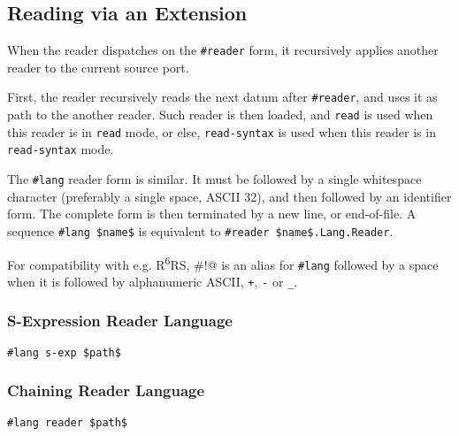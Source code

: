 \subsection{Reading via an Extension}
\label{subsec:aml-base-lang-reader-extension}

When the reader dispatches on the \lstinline!#reader! form, it recursively applies another reader to the current source port. 


First, the reader recursively reads the next datum after \lstinline!#reader!, and uses it as path to the another reader. Such reader is then loaded, and \lstinline!read! is used when this reader is in \lstinline!read! mode, or else, \lstinline!read-syntax! is used when this reader is in \lstinline!read-syntax! mode.

The \lstinline!#lang! reader form is similar. It must be followed by a single whitespace character (preferably a single space, ASCII 32), and then followed by an identifier form. The complete form is then terminated by a new line, or end-of-file. A sequence \lstinline!#lang $name$! is equivalent to \lstinline!#reader $name$.Lang.Reader!. 


For compatibility with e.g. R\textsuperscript{6}RS, \lstinline@#!@ is an alias for \lstinline!#lang! followed by a space when it is followed by alphanumeric ASCII, \lstinline!+!, \lstinline!-! or \lstinline!_!. 





\subsubsection{S-Expression Reader Language}

\begin{lstlisting}
#lang s-exp $path$
\end{lstlisting}





\subsubsection{Chaining Reader Language}

\begin{lstlisting}
#lang reader $path$
\end{lstlisting}






